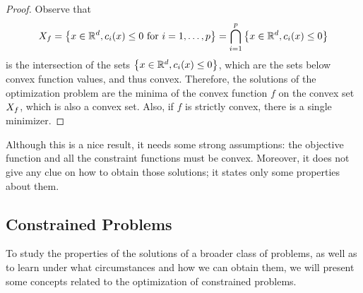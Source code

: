 \begin{proof}
    Observe that
    $$X_f = \left\{x \in \mathbb{R}^d, c_i(x) \leq 0 \text{ for } i=1, \ldots, p\right\} = \bigcap_{i=1}^p \left\{x \in \mathbb{R}^d, c_i(x) \leq 0\right\}$$ 
    is the intersection of the sets $\left\{x \in \mathbb{R}^d, c_i(x) \leq 0\right\}$, which are the sets below convex function values, and thus convex. Therefore, the solutions of the optimization problem are the minima of the convex function $f$ on the convex set $X_f$, which is also a convex set.
    Also, if $f$ is strictly convex, there is a single minimizer.
\end{proof}
Although this is a nice result, it needs some strong assumptions: the objective function and all the constraint functions must be convex. Moreover, it does not give any clue on how to obtain those solutions; it states only some properties about them.
%






\subsection{Constrained Problems}
To study the properties of the solutions of a broader class of problems, as well as to learn under what circumstances and how we can obtain them, we will present some concepts related to the optimization of constrained problems.
%

